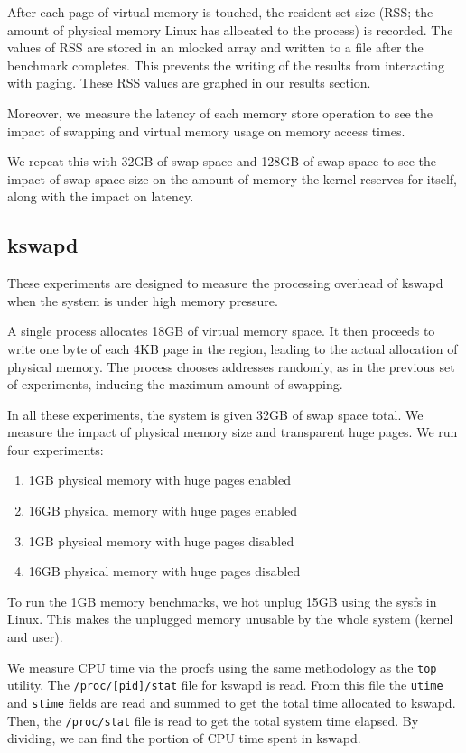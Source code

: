\documentclass[twocolumn,11pt]{article}
\begin{document}
After each page of virtual memory is touched, the resident set size (RSS; the
amount of physical memory Linux has allocated to the process) is recorded.  The
values of RSS are stored in an mlocked array and written to a file after the
benchmark completes. This prevents the writing of the results from interacting
with paging. These RSS values are graphed in our results section.

Moreover, we measure the latency of each memory store operation to see the
impact of swapping and virtual memory usage on memory access times.

We repeat this with 32GB of swap space and 128GB of swap space to see the
impact of swap space size on the amount of memory the kernel reserves for
itself, along with the impact on latency.

\subsection{kswapd}

These experiments are designed to measure the processing overhead of kswapd when
the system is under high memory pressure.

A single process allocates 18GB of virtual memory space. It then proceeds to
write one byte of each 4KB page in the region, leading to the actual allocation
of physical memory. The process chooses addresses randomly, as in the previous
set of experiments, inducing the maximum amount of swapping.

In all these experiments, the system is given 32GB of swap space total. We
measure the impact of physical memory size and transparent huge pages. We run
four experiments:

\begin{enumerate}
    \item 1GB physical memory with huge pages enabled
    \item 16GB physical memory with huge pages enabled
    \item 1GB physical memory with huge pages disabled
    \item 16GB physical memory with huge pages disabled
\end{enumerate}

To run the 1GB memory benchmarks, we hot unplug 15GB using the sysfs in Linux.
This makes the unplugged memory unusable by the whole system (kernel and user).

We measure CPU time via the procfs using the same methodology as the
\texttt{top} utility. The \texttt{/proc/[pid]/stat} file for kswapd is read.
From this file the \texttt{utime} and \texttt{stime} fields are read and summed
to get the total time allocated to kswapd. Then, the \texttt{/proc/stat} file is
read to get the total system time elapsed. By dividing, we can find the portion
of CPU time spent in kswapd.
\end{document}
